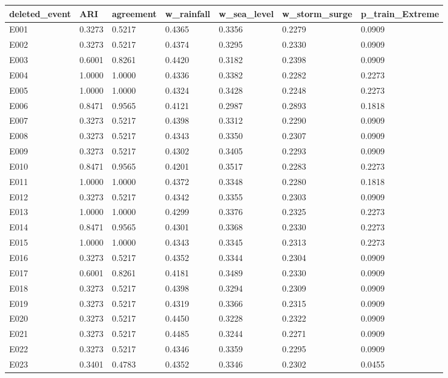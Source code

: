 \begin{tabular}{lllllll}
\hline
deleted\_event & ARI & agreement & w\_rainfall & w\_sea\_level & w\_storm\_surge & p\_train\_Extreme \\
\hline
E001 & 0.3273 & 0.5217 & 0.4365 & 0.3356 & 0.2279 & 0.0909 \\
E002 & 0.3273 & 0.5217 & 0.4374 & 0.3295 & 0.2330 & 0.0909 \\
E003 & 0.6001 & 0.8261 & 0.4420 & 0.3182 & 0.2398 & 0.0909 \\
E004 & 1.0000 & 1.0000 & 0.4336 & 0.3382 & 0.2282 & 0.2273 \\
E005 & 1.0000 & 1.0000 & 0.4324 & 0.3428 & 0.2248 & 0.2273 \\
E006 & 0.8471 & 0.9565 & 0.4121 & 0.2987 & 0.2893 & 0.1818 \\
E007 & 0.3273 & 0.5217 & 0.4398 & 0.3312 & 0.2290 & 0.0909 \\
E008 & 0.3273 & 0.5217 & 0.4343 & 0.3350 & 0.2307 & 0.0909 \\
E009 & 0.3273 & 0.5217 & 0.4302 & 0.3405 & 0.2293 & 0.0909 \\
E010 & 0.8471 & 0.9565 & 0.4201 & 0.3517 & 0.2283 & 0.2273 \\
E011 & 1.0000 & 1.0000 & 0.4372 & 0.3348 & 0.2280 & 0.1818 \\
E012 & 0.3273 & 0.5217 & 0.4342 & 0.3355 & 0.2303 & 0.0909 \\
E013 & 1.0000 & 1.0000 & 0.4299 & 0.3376 & 0.2325 & 0.2273 \\
E014 & 0.8471 & 0.9565 & 0.4301 & 0.3368 & 0.2330 & 0.2273 \\
E015 & 1.0000 & 1.0000 & 0.4343 & 0.3345 & 0.2313 & 0.2273 \\
E016 & 0.3273 & 0.5217 & 0.4352 & 0.3344 & 0.2304 & 0.0909 \\
E017 & 0.6001 & 0.8261 & 0.4181 & 0.3489 & 0.2330 & 0.0909 \\
E018 & 0.3273 & 0.5217 & 0.4398 & 0.3294 & 0.2309 & 0.0909 \\
E019 & 0.3273 & 0.5217 & 0.4319 & 0.3366 & 0.2315 & 0.0909 \\
E020 & 0.3273 & 0.5217 & 0.4450 & 0.3228 & 0.2322 & 0.0909 \\
E021 & 0.3273 & 0.5217 & 0.4485 & 0.3244 & 0.2271 & 0.0909 \\
E022 & 0.3273 & 0.5217 & 0.4346 & 0.3359 & 0.2295 & 0.0909 \\
E023 & 0.3401 & 0.4783 & 0.4352 & 0.3346 & 0.2302 & 0.0455 \\
\hline
\end{tabular}